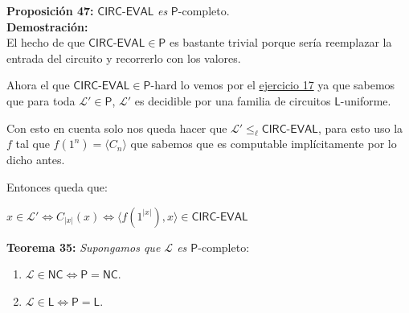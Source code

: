 \documentclass{article}
\begin{document}
\begin{flushleft}
  \textbf{Proposición 47:}
  $\mathsf{CIRC}$-$\mathsf{EVAL}$ \textit{es} $\mathsf{P}$-completo. \\ [0.5em]

  \textbf{\textcolor{Mulberry}{Demostración:}} \\[0.5em]

  El hecho de que \textcolor{Mulberry}{$\mathsf{CIRC}$-$\mathsf{EVAL \in P}$} es bastante trivial porque sería 
  reemplazar la entrada del circuito y recorrerlo con los valores.

  Ahora el que \textcolor{Mulberry}{$\mathsf{CIRC}$-$\mathsf{EVAL \in P}$-hard} lo vemos por el \hyperlink{ej17}
  {\textcolor{Rhodamine}{ejercicio 17}} ya que sabemos que para toda $\mathcal{L'} \in \mathsf{P}$, $\mathcal{L'}$
  es decidible por una familia de circuitos $\mathsf{L}$-uniforme.

  Con esto en cuenta solo nos queda hacer que $\mathcal{L'} \leq_\ell \mathsf{CIRC}$-$\mathsf{EVAL}$, para esto uso
  la $f$ tal que $f(1^n) = \langle C_n \rangle$ que sabemos que es computable implícitamente por lo dicho antes.

  Entonces queda que:
\end{flushleft}
\begin{center}
  $x \in \mathcal{L'} \iff C_{|x|}(x) \iff \langle f(1^{|x|}), x \rangle \in \mathsf{CIRC}$-$\mathsf{EVAL}$
\end{center}

\begin{flushleft}
  \textbf{Teorema 35:}
  \textit{Supongamos que $\mathcal{L}$ es $\mathsf{P}$}-completo:
\end{flushleft}
\begin{enumerate}
  \item $\mathcal{L} \in \mathsf{NC \iff P = NC}$.
  \item $\mathcal{L} \in \mathsf{L \iff P = L}$.
\end{enumerate}
\end{document}
